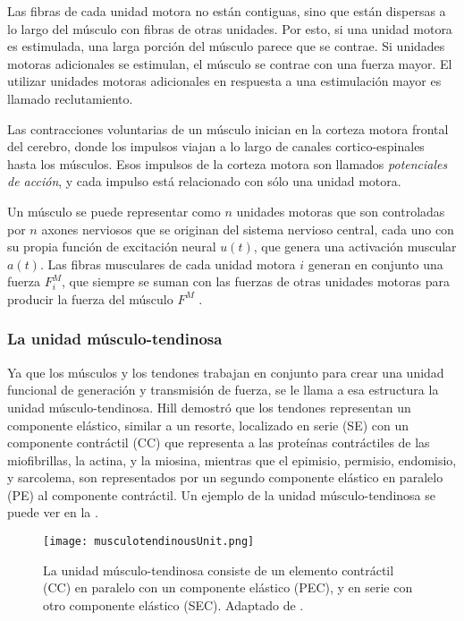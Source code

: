 Las fibras de cada unidad motora no están contiguas, sino que están dispersas a lo largo del músculo con fibras de otras unidades. Por esto, si una unidad motora es estimulada, una larga porción del músculo parece que se contrae. Si unidades motoras adicionales se estimulan, el músculo se contrae con una fuerza mayor. El utilizar unidades motoras adicionales en respuesta a una estimulación mayor es llamado reclutamiento.

Las contracciones voluntarias de un músculo inician en la corteza motora frontal del cerebro, donde los impulsos viajan a lo largo de canales cortico-espinales hasta los músculos. Esos impulsos de la corteza motora son llamados \textit{potenciales de acción}, y cada impulso está relacionado con sólo una unidad motora. 

Un músculo se puede representar como $n$ unidades motoras que son controladas por $n$ axones nerviosos que se originan del sistema nervioso central, cada uno con su propia función de excitación neural $u(t)$, que genera una activación muscular $a(t)$. Las fibras musculares de cada unidad motora $i$ generan en conjunto una fuerza $F_i^M$, que siempre se suman con las fuerzas de otras unidades motoras para producir la fuerza del músculo $F^M$ \citep{zajac1989muscle}.

\subsubsection{La unidad músculo-tendinosa}

Ya que los músculos y los tendones trabajan en conjunto para crear una unidad funcional de generación y transmisión de fuerza, se le llama a esa estructura la unidad músculo-tendinosa. Hill \citep{hill1970first} demostró que los tendones representan un componente elástico, similar a un resorte, localizado en serie (SE) con un componente contráctil (CC) que representa a las proteínas contráctiles de las miofibrillas, la actina, y la miosina, mientras que el epimisio, permisio, endomisio, y sarcolema, son representados por un segundo componente elástico en paralelo (PE) al componente contráctil. Un ejemplo de la unidad músculo-tendinosa se puede ver en la .

\begin{figure}[!ht]
	\centering
		\texttt{[image: musculotendinousUnit.png]}
	\caption[Unidad músculo-tendinosa.]{La unidad músculo-tendinosa consiste de un elemento contráctil (CC) en paralelo con un componente elástico (PEC), y en serie con otro componente elástico (SEC). Adaptado de \cite{biomechanics2012nordin}.}
	\label{fig:musculotendinousUnit}
\end{figure}

